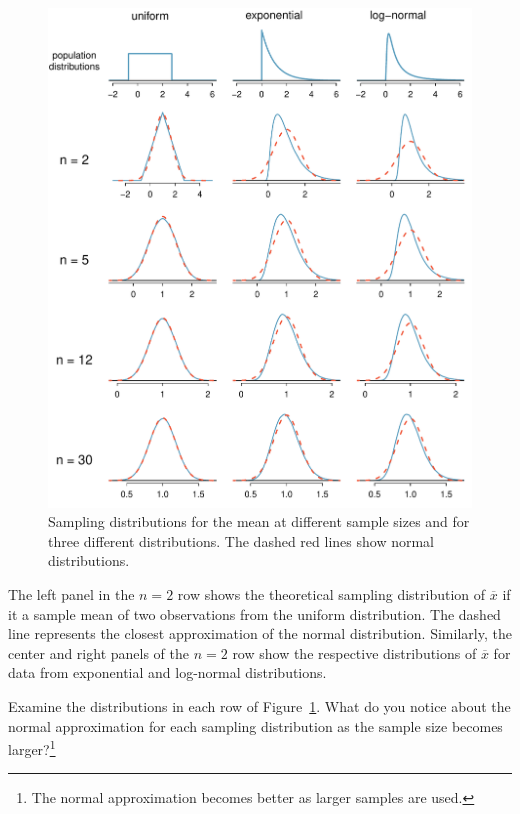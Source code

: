 \begin{spacing}{1.5}
\begin{figure}
   \centering
   \includegraphics[width=\textwidth]{ch_inference_foundations_oi_biostat/figures/cltSimulations/cltSimulations}
   \caption{Sampling distributions for the mean at different sample sizes and for three different distributions. The dashed red lines show normal distributions.}
   \label{cltSimulations}
\end{figure}

The left panel in the $n=2$ row shows the theoretical sampling distribution of $\overline{x}$ if it a sample mean of two observations from the uniform distribution. The dashed line represents the closest approximation of the normal distribution. Similarly, the center and right panels of the $n=2$ row show the respective distributions of $\overline{x}$ for data from exponential and log-normal distributions.

\begin{exercise}
Examine the distributions in each row of Figure~\ref{cltSimulations}. What do you notice about the normal approximation for each sampling distribution as the sample size becomes larger?\footnote{The normal approximation becomes better as larger samples are used.}
\end{exercise}


\end{spacing}
